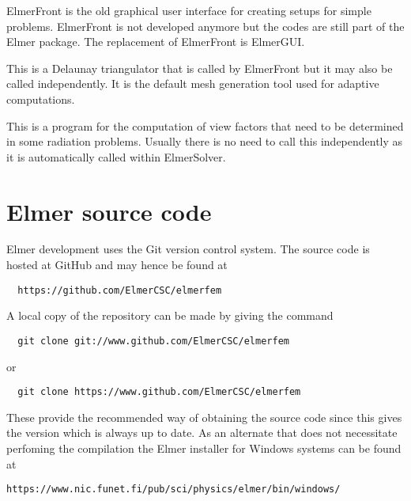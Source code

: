 ElmerFront is the old graphical user interface for creating setups for simple problems. 
ElmerFront is not developed anymore but the codes are still part of the Elmer package.
The replacement of ElmerFront is ElmerGUI. 

This is a Delaunay triangulator that is called by ElmerFront but it may also be called independently.
It is the default mesh generation tool used for adaptive computations.

This is a program for the computation of view factors that need to be determined in some radiation 
problems. Usually there is no need to call this independently as it is automatically called 
within ElmerSolver.
\sifend



\section{Elmer source code}

Elmer development uses the Git version control system. The source code is hosted at GitHub and may hence be found at
\begin{verbatim}
  https://github.com/ElmerCSC/elmerfem
\end{verbatim}
A local copy of the repository can be made by giving the command
\begin{verbatim}
  git clone git://www.github.com/ElmerCSC/elmerfem
\end{verbatim}
or
\begin{verbatim}
  git clone https://www.github.com/ElmerCSC/elmerfem
\end{verbatim}
These provide the recommended way of obtaining the source code since this gives the version which is always up to date. 
As an alternate that does not necessitate perfoming the compilation
the Elmer installer for Windows systems can be found at
\begin{verbatim}
https://www.nic.funet.fi/pub/sci/physics/elmer/bin/windows/
\end{verbatim}


